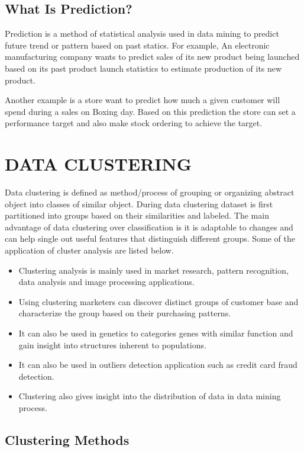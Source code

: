 \documentclass{article}
\begin{document}
\subsection{What Is Prediction?}\label{classification}

Prediction is a method of statistical analysis used in data mining to predict future trend or pattern based on past statics. For example, An electronic manufacturing company wants to predict sales of its new product being launched based on its past product launch statistics to estimate production of its new product.

Another example is a store want to predict how much a given customer will spend during a sales on Boxing day. Based on this prediction the store can set a performance target and also make stock ordering to achieve the target.



\section{DATA CLUSTERING }\label{sec:analysis}
Data clustering is defined as method/process of grouping or organizing abstract object into classes of similar object. During data clustering dataset is first partitioned into groups based on their similarities and labeled. The main advantage of  data clustering over classification is it is adaptable to changes and can help single out useful features that distinguish different groups. Some of the application of cluster analysis are listed below.
\begin{itemize}

\item Clustering analysis is mainly used in market research, pattern recognition, data analysis and image processing applications.
\item	Using clustering marketers can discover distinct groups of customer base and characterize the group based on their purchasing patterns.
\item	It can also be used in  genetics to categories genes with similar function and gain insight into structures inherent to populations.
\item It can also be used in outliers detection application such as credit card fraud detection.
\item	Clustering also gives insight into the distribution of data in data mining process.
\end{itemize}\pagebreak

\subsection{Clustering Methods }\label{sec:data clustering methods}
\end{document}
